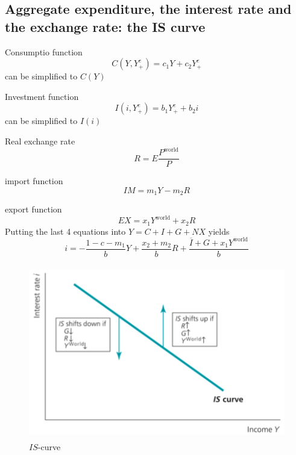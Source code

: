 \documentclass[a4paper] {scrartcl}
\begin{document}
\subsection{Aggregate expenditure, the interest rate and the exchange rate: the IS curve} %
\label{sub:aggregate_expenditure_the_interest_rate_and_the_exchange_rate_the_is_curve}
Consumptio function	
\begin{equation}
	C(Y, Y_+^e) =c_1Y+c_2Y_+^e
\end{equation}
can be simplified to $C(Y)$

Investment function
\begin{equation}
	I(i, Y_+^e) = b_1Y_+^e+b_2i
\end{equation}
can be simplified to $I(i)$


Real exchange rate
\begin{equation}
	\label{eq:real_exc_rate}
	R = E \frac{P^{\text{world}}}{P}
\end{equation}

import function
\begin{equation}
	IM = m_1Y-m_2R
\end{equation}

export function
\begin{equation}
	EX=x_1Y^{\text{world}}+x_2R
\end{equation}
Putting the last 4 equations into $Y = C + I + G + NX$ yields
\begin{equation}
	i = -\frac{1-c-m_1}{b}Y+\frac{x_2+m_2}{b}R+\frac{\overline I+G+x_1Y^{\text{world}}}{b}
\end{equation}

\begin{figure}[htbp]
	\centering
		\includegraphics[height=3in]{images/IS-curve.png}
	\caption{$IS$-curve}
	\label{fig:images_LM-curve}
\end{figure}
\end{document}
